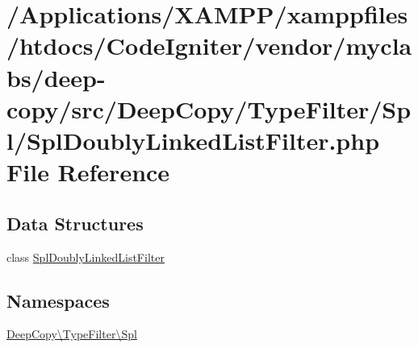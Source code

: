 \hypertarget{_spl_doubly_linked_list_filter_8php}{}\section{/\+Applications/\+X\+A\+M\+P\+P/xamppfiles/htdocs/\+Code\+Igniter/vendor/myclabs/deep-\/copy/src/\+Deep\+Copy/\+Type\+Filter/\+Spl/\+Spl\+Doubly\+Linked\+List\+Filter.php File Reference}
\label{_spl_doubly_linked_list_filter_8php}
\subsection*{Data Structures}
\begin{DoxyCompactItemize}
\item 
class \mbox{\hyperlink{class_deep_copy_1_1_type_filter_1_1_spl_1_1_spl_doubly_linked_list_filter}{Spl\+Doubly\+Linked\+List\+Filter}}
\end{DoxyCompactItemize}
\subsection*{Namespaces}
\begin{DoxyCompactItemize}
\item 
 \mbox{\hyperlink{namespace_deep_copy_1_1_type_filter_1_1_spl}{Deep\+Copy\textbackslash{}\+Type\+Filter\textbackslash{}\+Spl}}
\end{DoxyCompactItemize}
